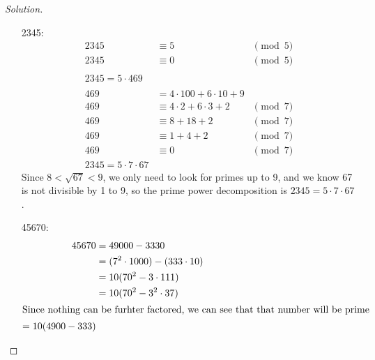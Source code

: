 \documentclass[11pt]{article}
\newenvironment{solution}
  {\renewcommand\qedsymbol{$~$}\begin{proof}[Solution]$ $\par\nobreak\ignorespaces}
  {\end{proof}}
\begin{document}
\begin{solution}
  \begin{itemize}
    \item [2345:]
          \begin{align*}
            2345 & \equiv 5                         & \pmod{5} \\
            2345 & \equiv 0                         & \pmod{5} \\
            \\
            2345 = 5\cdot 469                                  \\
            \\
            469  & = 4 \cdot 100 + 6 \cdot 10 + 9   &          \\
            469  & \equiv 4 \cdot 2 + 6 \cdot 3 + 2 & \pmod{7} \\
            469  & \equiv 8 + 18 + 2                & \pmod{7} \\
            469  & \equiv 1 + 4 + 2                 & \pmod{7} \\
            469  & \equiv 0                         & \pmod{7} \\
            2345 = 5\cdot 7 \cdot 67
          \end{align*}
          Since $8<\sqrt{67}<9$, we only need to look for primes up to 9, and we know 67 is not divisible by 1 to 9, so the prime power decomposition is $2345=5\cdot 7 \cdot 67$.
    \item [45670:]
          \begin{align*}
            45670 & = 49000 - 3330                      \\
                  & = (7^2 \cdot 1000) - (333 \cdot 10) \\
                  & = 10(70^2-3 \cdot 111)              \\
                  & = 10(70^2- 3^2 \cdot 37)            \\
            \intertext{Since nothing can be furhter factored, we can see that that number will be prime}
            = 10(4900- 333)                             \\
          \end{align*}


\end{itemize}
\end{solution}
\end{document}
